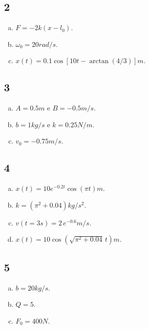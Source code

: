 \documentclass[a4paper,10pt]{article}
\begin{document}
\subsection*{2}

\begin{enumerate}[(a)]
\item $F = -2k(x-l_0)$.

\item $\omega_0 = 20 \unit{rad/s}$.

\item $x(t) = 0.1 \cos[10t - \arctan(4/3)] \unit{m}$.
\end{enumerate}

\subsection*{3}

\begin{enumerate}[(a)]
\item $A = 0.5 \unit{m}$ e $B = -0.5 \unit{m/s}$.

\item $b = 1 \unit{kg/s}$ e $k = 0.25 \unit{N/m}$.

\item $v_0 = -0.75 \unit{m/s}$.
\end{enumerate}

\subsection*{4}

\begin{enumerate}[(a)]
\item $x(t) = 10 e^{-0.2 t} \cos(\pi t) \unit{m}$.

\item $k = (\pi^2 + 0.04) \unit{kg/s^2}$.

\item $v(t = 3 \unit{s}) = 2 \, e^{-0.6} \unit{m/s}$.

\item $x(t) = 10 \cos(\sqrt{\pi^2 + 0.04} \, t) \unit{m}$.
\end{enumerate}

\subsection*{5}

\begin{enumerate}[(a)]
\item $b = 20 \unit{kg/s}$.

\item $Q = 5$.

\item $F_0 = 400 \unit{N}$.
\end{enumerate}
\end{document}
